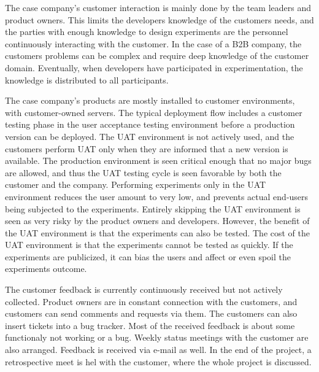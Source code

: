 \documentclass[english]{tktltiki2}
\theoremstyle{definition}
\theoremstyle{remark}
\begin{document}
The case company's customer interaction is mainly done by the team leaders and product owners. This limits the developers knowledge of the customers needs, and the parties with enough knowledge to design experiments are the personnel continuously interacting with the customer. In the case of a B2B company, the customers problems can be complex and require deep knowledge of the customer domain. Eventually, when developers have participated in experimentation, the knowledge is distributed to all participants.

The case company's products are mostly installed to customer environments, with customer-owned servers. The typical deployment flow includes a customer testing phase in the user acceptance testing environment before a production version can be deployed. The UAT environment is not actively used, and the customers perform UAT only when they are informed that a new version is available. The production environment is seen critical enough that no major bugs are allowed, and thus the UAT testing cycle is seen favorable by both the customer and the company. Performing experiments only in the UAT environment reduces the user amount to very low, and prevents actual end-users being subjected to the experiments. Entirely skipping the UAT environment is seen as very risky by the product owners and developers. However, the benefit of the UAT environment is that the experiments can also be tested. The cost of the UAT environment is that the experiments cannot be tested as quickly. If the experiments are publicized, it can bias the users and affect or even spoil the experiments outcome.  


The customer feedback is currently continuously received but not actively collected. Product owners are in constant connection with the customers, and customers can send comments and requests via them. The customers can also insert tickets into a bug tracker. Most of the received feedback is about some functionaly not working or a bug. Weekly status meetings with the customer are also arranged. Feedback is received via e-mail as well. In the end of the project, a retrospective meet is hel with the customer, where the whole project is discussed.  
\end{document}
